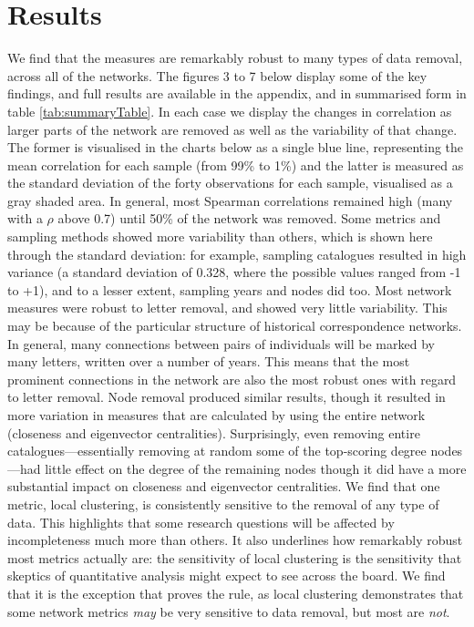 \documentclass[]{article}
\begin{document}
\hypertarget{results}{%
\section{Results}\label{results}}

We find that the measures are remarkably robust to many types of data removal, across all of the networks. The figures 3 to 7 below display some of the key findings, and full results are available in the appendix, and in summarised form in table \ref{tab:summaryTable}. In each case we display the changes in correlation as larger parts of the network are removed as well as the variability of that change. The former is visualised in the charts below as a single blue line, representing the mean correlation for each sample (from 99\% to 1\%) and the latter is measured as the standard deviation of the forty observations for each sample, visualised as a gray shaded area. In general, most Spearman correlations remained high (many with a \(\rho\) above 0.7) until 50\% of the network was removed. Some metrics and sampling methods showed more variability than others, which is shown here through the standard deviation: for example, sampling catalogues resulted in high variance (a standard deviation of 0.328, where the possible values ranged from -1 to +1), and to a lesser extent, sampling years and nodes did too. Most network measures were robust to letter removal, and showed very little variability. This may be because of the particular structure of historical correspondence networks. In general, many connections between pairs of individuals will be marked by many letters, written over a number of years. This means that the most prominent connections in the network are also the most robust ones with regard to letter removal. Node removal produced similar results, though it resulted in more variation in measures that are calculated by using the entire network (closeness and eigenvector centralities). Surprisingly, even removing entire catalogues---essentially removing at random some of the top-scoring degree nodes---had little effect on the degree of the remaining nodes though it did have a more substantial impact on closeness and eigenvector centralities. We find that one metric, local clustering, is consistently sensitive to the removal of any type of data. This highlights that some research questions will be affected by incompleteness much more than others. It also underlines how remarkably robust most metrics actually are: the sensitivity of local clustering is the sensitivity that skeptics of quantitative analysis might expect to see across the board. We find that it is the exception that proves the rule, as local clustering demonstrates that some network metrics \emph{may} be very sensitive to data removal, but most are \emph{not}.
\end{document}
